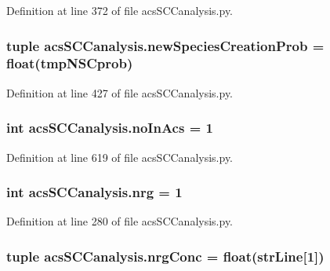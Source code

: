 Definition at line 372 of file acs\-S\-C\-Canalysis.\-py.

\hypertarget{a00128_a47b24df6e487f6dd90158dde93cc7c93}{
\subsubsection[{new\-Species\-Creation\-Prob}]{\setlength{\rightskip}{0pt plus 5cm}tuple acs\-S\-C\-Canalysis.\-new\-Species\-Creation\-Prob = float(tmp\-N\-S\-Cprob)}}\label{a00128_a47b24df6e487f6dd90158dde93cc7c93}


Definition at line 427 of file acs\-S\-C\-Canalysis.\-py.

\hypertarget{a00128_a4766b3ca835449f1aa287fda699c7f96}{
\subsubsection[{no\-In\-Acs}]{\setlength{\rightskip}{0pt plus 5cm}int acs\-S\-C\-Canalysis.\-no\-In\-Acs = 1}}\label{a00128_a4766b3ca835449f1aa287fda699c7f96}


Definition at line 619 of file acs\-S\-C\-Canalysis.\-py.

\hypertarget{a00128_a948683f966c62ac856582281c3cda1f4}{
\subsubsection[{nrg}]{\setlength{\rightskip}{0pt plus 5cm}int acs\-S\-C\-Canalysis.\-nrg = 1}}\label{a00128_a948683f966c62ac856582281c3cda1f4}


Definition at line 280 of file acs\-S\-C\-Canalysis.\-py.

\hypertarget{a00128_a24d5f5a61d56c596017396ad272ef4a4}{
\subsubsection[{nrg\-Conc}]{\setlength{\rightskip}{0pt plus 5cm}tuple acs\-S\-C\-Canalysis.\-nrg\-Conc = float({\bf str\-Line}\mbox{[}1\mbox{]})}}\label{a00128_a24d5f5a61d56c596017396ad272ef4a4}


